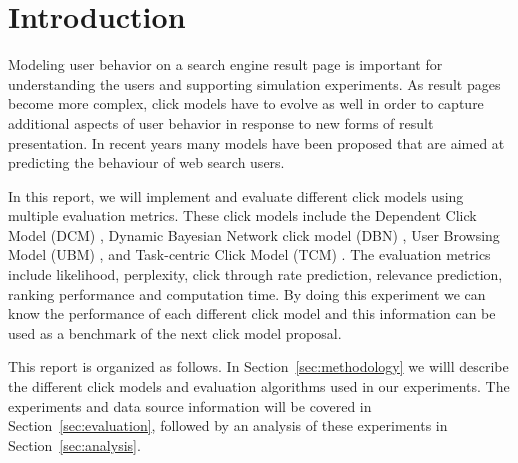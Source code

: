 \section{Introduction}
Modeling user behavior on a search engine result page is important for understanding the users and supporting simulation experiments.
As result pages become more complex, click models have to evolve as well in order to capture additional aspects of user behavior in response to new forms of result presentation.
In recent years many models have been proposed that are aimed at predicting the behaviour of web search users. 

In this report, we will implement and evaluate different click models using multiple evaluation metrics.
These click models include the Dependent Click Model (DCM) \cite{Guo2009}, Dynamic Bayesian Network click model (DBN) \cite{Chapelle2009}, User Browsing Model (UBM) \cite{Dupret2008}, and Task-centric Click Model (TCM) \cite{Zhang2011}.
The evaluation metrics include likelihood, perplexity, click through rate prediction, relevance prediction, ranking performance and computation time.
By doing this experiment we can know the performance of each different click model and this information can be used as a benchmark of the next click model proposal.

This report is organized as follows.
In Section~\ref{sec:methodology} we willl describe the different click models and evaluation algorithms used in our experiments.
The experiments and data source information will be covered in Section~\ref{sec:evaluation}, followed by an analysis of these experiments in Section~\ref{sec:analysis}.
